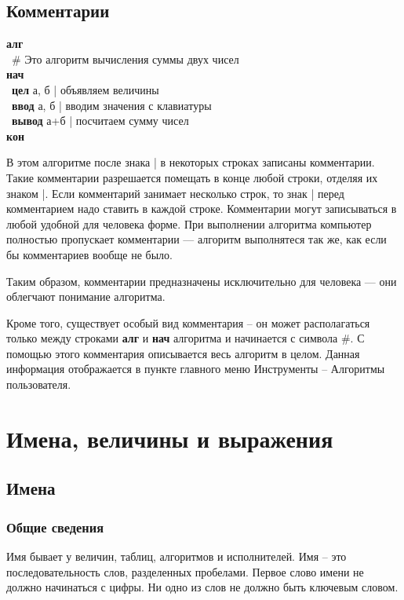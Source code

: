 \documentclass[12pt,a4paper]{article}
\newcommand{\otstup}{\textperiodcentered\ }
\begin{document}
\subsection{Комментарии}

{\sffamily
\textbf{алг}\\
\otstup \# Это алгоритм вычисления суммы двух чисел\\
\textbf{нач}\\
\otstup \textbf{цел} а, б | объявляем величины\\
\otstup \textbf{ввод} а, б | вводим значения с клавиатуры\\
\otstup \textbf{вывод} а+б | посчитаем сумму чисел\\
\textbf{кон}}

В этом алгоритме после знака \textsf{|} в некоторых строках записаны комментарии. Такие комментарии разрешается помещать в конце любой строки, отделяя их знаком \textsf{|}. Если комментарий занимает несколько строк, то знак \textsf{|} перед комментарием надо ставить в каждой строке. Комментарии могут записываться в любой удобной для человека форме. При выполнении алгоритма компьютер полностью пропускает комментарии --- алгоритм выполнятеся так же, как если бы комментариев вообще не было.

Таким образом, комментарии предназначены исключительно для человека --- они облегчают понимание алгоритма.

Кроме того, существует особый вид комментария -- он может располагаться только между строками \textsf{\textbf{алг}} и \textsf{\textbf{нач}} алгоритма и начинается с символа \textsf{\#}. С помощью этого комментария описывается весь алгоритм в целом. Данная информация отображается в пункте главного меню \textsf{Инструменты -- Алгоритмы пользователя}.

\section{Имена, величины и выражения}

\subsection{Имена}
\label{names}

\subsubsection{Общие сведения}

	Имя бывает у величин, таблиц, алгоритмов и исполнителей.  Имя – это последовательность слов, разделенных пробелами. Первое слово имени не должно начинаться с цифры. Ни одно из слов не должно быть ключевым словом.
	
\end{document}
